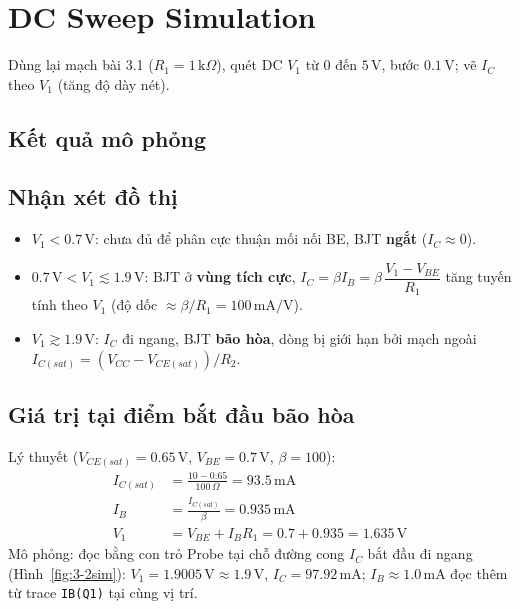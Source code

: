 \section{DC Sweep Simulation}
Dùng lại mạch bài 3.1 ($R_1 = 1\,\text{k}\Omega$), quét DC $V_1$ từ $0$ đến $5\,\text{V}$, bước $0.1\,\text{V}$; vẽ $I_C$ theo $V_1$ (tăng độ dày nét).


\subsection{Kết quả mô phỏng}

\subsection{Nhận xét đồ thị}
\begin{itemize}
  \item $V_1 < 0.7\,\text{V}$: chưa đủ để phân cực thuận mối nối BE, BJT \textbf{ngắt} ($I_C \approx 0$).
  \item $0.7\,\text{V} < V_1 \lesssim 1.9\,\text{V}$: BJT ở \textbf{vùng tích cực}, $I_C = \beta I_B = \beta\,\dfrac{V_1 - V_{BE}}{R_1}$ tăng tuyến tính theo $V_1$ (độ dốc $\approx \beta/R_1 = 100\,\text{mA/V}$).
  \item $V_1 \gtrsim 1.9\,\text{V}$: $I_C$ đi ngang, BJT \textbf{bão hòa}, dòng bị giới hạn bởi mạch ngoài $I_{C(sat)} = (V_{CC} - V_{CE(sat)})/R_2$.
\end{itemize}

\subsection{Giá trị tại điểm bắt đầu bão hòa}
Lý thuyết ($V_{CE(sat)} = 0.65\,\text{V}$, $V_{BE} = 0.7\,\text{V}$, $\beta = 100$):
\begin{align*}
I_{C(sat)} &= \frac{10 - 0.65}{100\,\Omega} = 93.5\,\text{mA}\\
I_B &= \frac{I_{C(sat)}}{\beta} = 0.935\,\text{mA}\\
V_1 &= V_{BE} + I_B R_1 = 0.7 + 0.935 = 1.635\,\text{V}
\end{align*}
Mô phỏng: đọc bằng con trỏ Probe tại chỗ đường cong $I_C$ bắt đầu đi ngang (Hình~\ref{fig:3-2sim}): $V_1 = 1.9005\,\text{V} \approx 1.9\,\text{V}$, $I_C = 97.92\,\text{mA}$; $I_B \approx 1.0\,\text{mA}$ đọc thêm từ trace \texttt{IB(Q1)} tại cùng vị trí.

